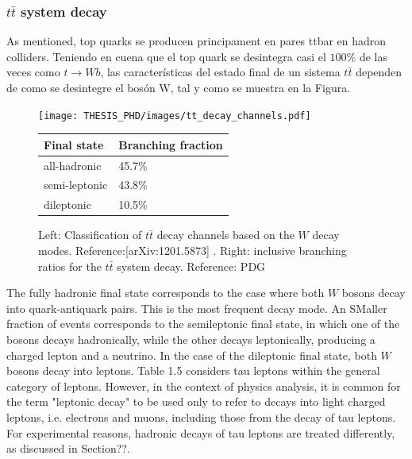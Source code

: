 \documentclass[11pt,twoside]{book}
\begin{document}
\subsubsection*{$t\bar{t}$ system decay}
\label{subsec:top_quark_decay}
As mentioned, top quarks se producen principament en pares ttbar en hadron colliders. Teniendo en cuena que el top quark se desintegra casi el $100\%$ de las veces como $t\rightarrow Wb$, las características del estado final de un sistema $t\bar{t}$ dependen de como se desintegre el bosón W, tal y como se muestra en la Figura.
\begin{figure}[htbp]
    \centering
    \begin{minipage}[b]{0.48\textwidth}
        \centering
        \texttt{[image: THESIS\_PHD/images/tt\_decay\_channels.pdf]}
        \label{fig:example-diagram}
    \end{minipage}
    \hfill
    \begin{minipage}[b]{0.48\textwidth}
        \centering
        \label{tab:example-crosssections}
        \begin{tabular}{ll}
            \hline
            \textbf{Final state} & \textbf{Branching fraction} \\ \hline
            all-hadronic         & 45.7\%                     \\
            semi-leptonic        & 43.8\%                     \\
            dileptonic           & 10.5\%                     \\\hline
        \end{tabular}
    \end{minipage}
    \caption{Left: Classification of $t\bar{t}$ decay channels based on the $W$ decay modes. Reference:[arXiv:1201.5873] . Right: inclusive branching ratios for the $t\bar{t}$ system decay. Reference: PDG}
    \label{fig:diagram-and-table}
\end{figure}
The fully hadronic final state corresponds to the case where both $W$ bosons decay into quark-antiquark pairs. This is the most frequent decay mode. An \acrshort{SM}aller fraction of events corresponds to the semileptonic final state, in which one of the bosons decays hadronically, while the other decays leptonically, producing a charged lepton and a neutrino. In the case of the dileptonic final state, both $W$ bosons decay into leptons.
Table 1.5 considers tau leptons within the general category of leptons. However, in the context of physics analysis, it is common for the term "leptonic decay" to be used only to refer to decays into light charged leptons, i.e. electrons and muons, including those from the decay of tau leptons. For experimental reasons, hadronic decays of tau leptons are treated differently, as discussed in Section??.
\end{document}
